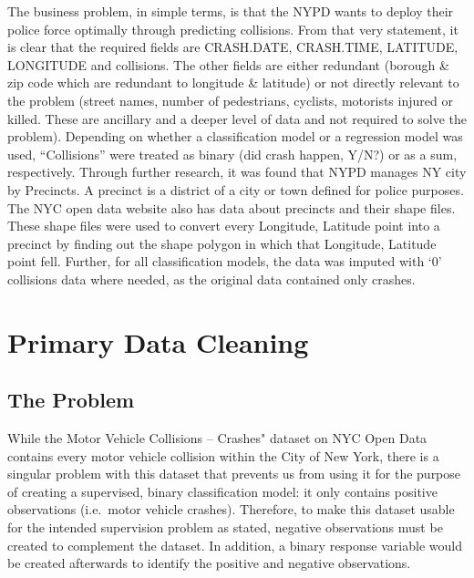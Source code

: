 The business problem, in simple terms, is that the NYPD wants to deploy
their police force optimally through predicting collisions. From that
very statement, it is clear that the required fields are CRASH.DATE,
CRASH.TIME, LATITUDE, LONGITUDE and collisions. The other fields are
either redundant (borough \& zip code which are redundant to longitude
\& latitude) or not directly relevant to the problem (street names,
number of pedestrians, cyclists, motorists injured or killed. These are
ancillary and a deeper level of data and not required to solve the
problem). Depending on whether a classification model or a regression
model was used, ``Collisions'' were treated as binary (did crash happen,
Y/N?) or as a sum, respectively. Through further research, it was found
that NYPD manages NY city by Precincts. A precinct is a district of a
city or town defined for police purposes. The NYC open data website also
has data about precincts and their shape files. These shape files were
used to convert every Longitude, Latitude point into a precinct by
finding out the shape polygon in which that Longitude, Latitude point
fell. Further, for all classification models, the data was imputed with
`0' collisions data where needed, as the original data contained only
crashes.

\hypertarget{primary-data-cleaning}{%
\section{Primary Data Cleaning}\label{primary-data-cleaning}}

\hypertarget{the-problem}{%
\subsection{The Problem}\label{the-problem}}

While the Motor Vehicle Collisions -- Crashes" dataset on NYC Open Data
contains every motor vehicle collision within the City of New York,
there is a singular problem with this dataset that prevents us from
using it for the purpose of creating a supervised, binary classification
model: it only contains positive observations (i.e.~motor vehicle
crashes). Therefore, to make this dataset usable for the intended
supervision problem as stated, negative observations must be created to
complement the dataset. In addition, a binary response variable would be
created afterwards to identify the positive and negative observations.

